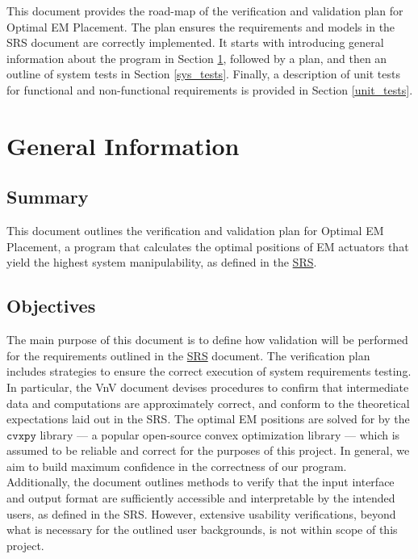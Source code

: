 \documentclass[12pt, titlepage]{article}
\begin{document}

This document provides the road-map of the verification and validation plan for Optimal EM Placement. The plan ensures the requirements and models in the SRS document are correctly implemented. It starts with introducing general information about the program in Section \ref{gen_info}, followed by a plan, and then an outline of system tests in Section \ref{sys_tests}. Finally, a description of unit tests for functional and non-functional requirements is provided in Section \ref{unit_tests}.

\section{General Information} \label{gen_info}

\subsection{Summary}
This document outlines the verification and validation plan for Optimal EM Placement, a program that calculates the optimal positions of EM actuators that yield the highest system manipulability, as defined in the \href{https://github.com/husseinsd1/optimal-em-arrangement/blob/main/docs/SRS/SRS.pdf}{SRS}. 

\subsection{Objectives}
The main purpose of this document is to define how validation will be performed for the requirements outlined in the \href{https://github.com/husseinsd1/optimal-em-arrangement/blob/main/docs/SRS/SRS.pdf}{SRS} document. The verification plan includes strategies to ensure the correct execution of system requirements testing. In particular, the VnV document devises procedures to confirm that intermediate data and computations are approximately correct, and conform to the theoretical expectations laid out in the SRS. The optimal EM positions are solved for by the \href{https://www.cvxpy.org/}{$\texttt{cvxpy}$} library --- a popular open-source convex optimization library --- which is assumed to be reliable and correct for the purposes of this project. In general, we aim to build maximum confidence in the correctness of our program. Additionally, the document outlines methods to verify that the input interface and output format are sufficiently accessible and interpretable by the intended users, as defined in the SRS. However, extensive usability verifications, beyond what is necessary for the outlined user backgrounds, is not within scope of this project.
\end{document}
